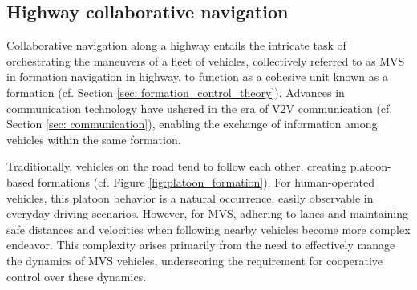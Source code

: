     
    





\subsection{Highway collaborative navigation} \label{sec: Highway_cooperative_navigation}
Collaborative navigation along a highway entails the intricate task of orchestrating the maneuvers of a fleet of vehicles, collectively referred to as MVS in formation navigation in highway, to function as a cohesive unit known as a formation (cf. Section \ref{sec: formation_control_theory}). Advances in communication technology have ushered in the era of V2V communication (cf. Section \ref{sec: communication}), enabling the exchange of information among vehicles within the same formation. 

Traditionally, vehicles on the road tend to follow each other, creating platoon-based formations (cf. Figure \ref{fig:platoon_formation}). For human-operated vehicles, this platoon behavior is a natural occurrence, easily observable in everyday driving scenarios. However, for MVS, adhering to lanes and maintaining safe distances and velocities when following nearby vehicles become more complex endeavor. This complexity arises primarily from the need to effectively manage the dynamics of MVS vehicles, underscoring the requirement for cooperative control over these dynamics.

